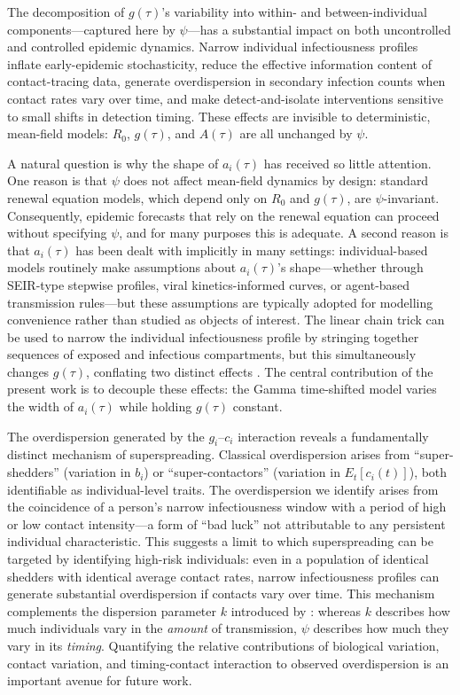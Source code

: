 \documentclass[10pt]{article}
\begin{document}
The decomposition of $g(\tau)$'s variability into within- and between-individual components---captured here by $\psi$---has a substantial impact on both uncontrolled and controlled epidemic dynamics. Narrow individual infectiousness profiles inflate early-epidemic stochasticity, reduce the effective information content of contact-tracing data, generate overdispersion in secondary infection counts when contact rates vary over time, and make detect-and-isolate interventions sensitive to small shifts in detection timing. These effects are invisible to deterministic, mean-field models: $R_0$, $g(\tau)$, and $A(\tau)$ are all unchanged by $\psi$.

A natural question is why the shape of $a_i(\tau)$ has received so little attention. One reason is that $\psi$ does not affect mean-field dynamics by design: standard renewal equation models, which depend only on $R_0$ and $g(\tau)$, are $\psi$-invariant. Consequently, epidemic forecasts that rely on the renewal equation can proceed without specifying $\psi$, and for many purposes this is adequate. A second reason is that $a_i(\tau)$ has been dealt with implicitly in many settings: individual-based models routinely make assumptions about $a_i(\tau)$'s shape---whether through SEIR-type stepwise profiles, viral kinetics-informed curves, or agent-based transmission rules---but these assumptions are typically adopted for modelling convenience rather than studied as objects of interest. The linear chain trick can be used to narrow the individual infectiousness profile by stringing together sequences of exposed and infectious compartments, but this simultaneously changes $g(\tau)$, conflating two distinct effects \citep{wearing_appropriate_2005, lloyd_realistic_2001}. The central contribution of the present work is to decouple these effects: the Gamma time-shifted model varies the width of $a_i(\tau)$ while holding $g(\tau)$ constant.

The overdispersion generated by the $g_i$--$c_i$ interaction reveals a fundamentally distinct mechanism of superspreading. Classical overdispersion arises from ``super-shedders'' (variation in $b_i$) or ``super-contactors'' (variation in $E_t[c_i(t)]$), both identifiable as individual-level traits. The overdispersion we identify arises from the coincidence of a person's narrow infectiousness window with a period of high or low contact intensity---a form of ``bad luck'' not attributable to any persistent individual characteristic. This suggests a limit to which superspreading can be targeted by identifying high-risk individuals: even in a population of identical shedders with identical average contact rates, narrow infectiousness profiles can generate substantial overdispersion if contacts vary over time. This mechanism complements the dispersion parameter $k$ introduced by \citet{lloyd-smith_superspreading_2005}: whereas $k$ describes how much individuals vary in the \textit{amount} of transmission, $\psi$ describes how much they vary in its \textit{timing}. Quantifying the relative contributions of biological variation, contact variation, and timing-contact interaction to observed overdispersion is an important avenue for future work.
\end{document}
